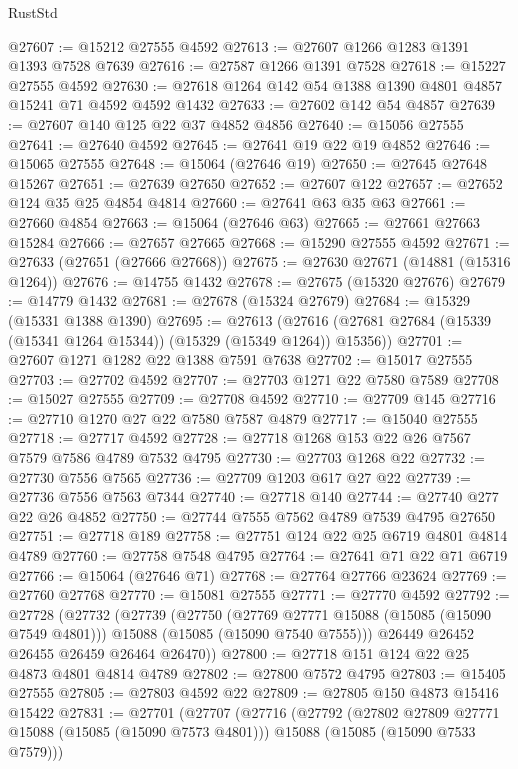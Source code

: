 \begin{lexlean}{RustStd}
\begin{coremodule}
@27607 := @15212 @27555 @4592
@27613 := @27607 @1266 @1283 @1391 @1393 @7528 @7639
@27616 := @27587 @1266 @1391 @7528
@27618 := @15227 @27555 @4592
@27630 := @27618 @1264 @142 @54 @1388 @1390 @4801 @4857 @15241 @71 @4592 @4592 @1432
@27633 := @27602 @142 @54 @4857
@27639 := @27607 @140 @125 @22 @37 @4852 @4856
@27640 := @15056 @27555
@27641 := @27640 @4592
@27645 := @27641 @19 @22 @19 @4852
@27646 := @15065 @27555
@27648 := @15064 (@27646 @19)
@27650 := @27645 @27648 @15267
@27651 := @27639 @27650
@27652 := @27607 @122
@27657 := @27652 @124 @35 @25 @4854 @4814
@27660 := @27641 @63 @35 @63
@27661 := @27660 @4854
@27663 := @15064 (@27646 @63)
@27665 := @27661 @27663 @15284
@27666 := @27657 @27665
@27668 := @15290 @27555 @4592
@27671 := @27633 (@27651 (@27666 @27668))
@27675 := @27630 @27671 (@14881 (@15316 @1264))
@27676 := @14755 @1432
@27678 := @27675 (@15320 @27676)
@27679 := @14779 @1432
@27681 := @27678 (@15324 @27679)
@27684 := @15329 (@15331 @1388 @1390)
@27695 := @27613
    (@27616 (@27681 @27684 (@15339 (@15341 @1264 @15344)) (@15329 (@15349 @1264)) @15356))
@27701 := @27607 @1271 @1282 @22 @1388 @7591 @7638
@27702 := @15017 @27555
@27703 := @27702 @4592
@27707 := @27703 @1271 @22 @7580 @7589
@27708 := @15027 @27555
@27709 := @27708 @4592
@27710 := @27709 @145
@27716 := @27710 @1270 @27 @22 @7580 @7587 @4879
@27717 := @15040 @27555
@27718 := @27717 @4592
@27728 := @27718 @1268 @153 @22 @26 @7567 @7579 @7586 @4789 @7532 @4795
@27730 := @27703 @1268 @22
@27732 := @27730 @7556 @7565
@27736 := @27709 @1203 @617 @27 @22
@27739 := @27736 @7556 @7563 @7344
@27740 := @27718 @140
@27744 := @27740 @277 @22 @26 @4852
@27750 := @27744 @7555 @7562 @4789 @7539 @4795 @27650
@27751 := @27718 @189
@27758 := @27751 @124 @22 @25 @6719 @4801 @4814 @4789
@27760 := @27758 @7548 @4795
@27764 := @27641 @71 @22 @71 @6719
@27766 := @15064 (@27646 @71)
@27768 := @27764 @27766 @23624
@27769 := @27760 @27768
@27770 := @15081 @27555
@27771 := @27770 @4592
@27792 := @27728
    (@27732
      (@27739
        (@27750
          (@27769 @27771 @15088 (@15085 (@15090 @7549 @4801)))
          @15088
          (@15085 (@15090 @7540 @7555)))
        @26449
        @26452
        @26455
        @26459
        @26464
        @26470))
@27800 := @27718 @151 @124 @22 @25 @4873 @4801 @4814 @4789
@27802 := @27800 @7572 @4795
@27803 := @15405 @27555
@27805 := @27803 @4592 @22
@27809 := @27805 @150 @4873 @15416 @15422
@27831 := @27701
    (@27707
      (@27716
        (@27792
          (@27802 @27809 @27771 @15088 (@15085 (@15090 @7573 @4801)))
          @15088
          (@15085 (@15090 @7533 @7579)))

\end{coremodule}
\end{lexlean}
